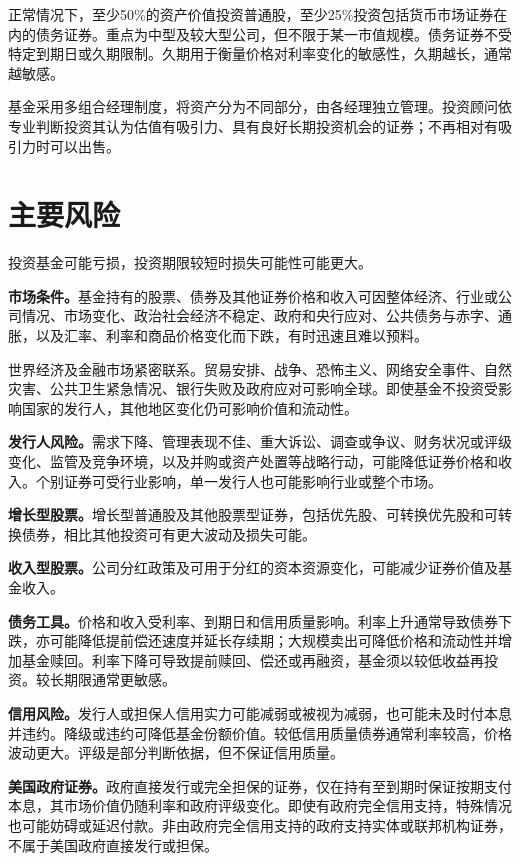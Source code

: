 \documentclass[UTF8,fontset=none,11pt,a4paper]{ctexart}
\begin{document}
正常情况下，至少50\%的资产价值投资普通股，至少25\%投资包括货币市场证券在内的债务证券。重点为中型及较大型公司，但不限于某一市值规模。债务证券不受特定到期日或久期限制。久期用于衡量价格对利率变化的敏感性，久期越长，通\allowbreak\mbox{常越敏感。}


基金采用多组合经理制度，将资产分为不同部分，由各经理独立管理。投资顾问依专业判断投资其认为估值有吸引力、具有良好长期投资机会的证券；不再相对有吸引力时\allowbreak\mbox{可以出售。}


\section*{主要风险}
投资基金可能亏损，投资期限较短时损失可能性\allowbreak\mbox{可能更大。}


\textbf{市场条件。}基金持有的股票、债券及其他证券价格和收入可因整体经济、行业或公司情况、市场变化、政治社会经济不稳定、政府和央行应对、公共债务与赤字、通胀，以及汇率、利率和商品价格变化而下跌，有时迅速且\allowbreak\mbox{难以预料。}


世界经济及金融市场紧密联系。贸易安排、战争、恐怖主义、网络安全事件、自然灾害、公共卫生紧急情况、银行失败及政府应对可影响全球。即使基金不投资受影响国家的发行人，其他地区变化仍可影响价值\allowbreak\mbox{和流动性。}


\textbf{发行人风险。}需求下降、管理表现不佳、重大诉讼、调查或争议、财务状况或评级变化、监管及竞争环境，以及并购或资产处置等战略行动，可能降低证券价格和收入。个别证券可受行业影响，单一发行人也可能影响行业或\allowbreak\mbox{整个市场。}


\textbf{增长型股票。}增长型普通股及其他股票型证券，包括优先股、可转换优先股和可转换债券，相比其他投资可有更大波动及\allowbreak\mbox{损失可能。}

\textbf{收入型股票。}公司分红政策及可用于分红的资本资源变化，可能减少证券价值及\allowbreak\mbox{基金收入。}


\textbf{债务工具。}价格和收入受利率、到期日和信用质量影响。利率上升通常导致债券下跌，亦可能降低提前偿还速度并延长存续期；大规模卖出可降低价格和流动性并增加基金赎回。利率下降可导致提前赎回、偿还或再融资，基金须以较低收益再投资。较长期限通\allowbreak\mbox{常更敏感。}


\textbf{信用风险。}发行人或担保人信用实力可能减弱或被视为减弱，也可能未及时付本息并违约。降级或违约可降低基金份额价值。较低信用质量债券通常利率较高，价格波动更大。评级是部分判断依据，但不保证\allowbreak\mbox{信用质量。}


\textbf{美国政府证券。}政府直接发行或完全担保的证券，仅在持有至到期时保证按期支付本息，其市场价值仍随利率和政府评级变化。即使有政府完全信用支持，特殊情况也可能妨碍或延迟付款。非由政府完全信用支持的政府支持实体或联邦机构证券，不属于美国政府直接发\allowbreak\mbox{行或担保。}
\end{document}
